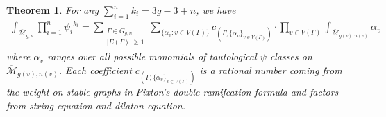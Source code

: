 \documentclass[12pt,reqno]{amsart}
\theoremstyle{plain}
\newtheorem{theorem}{Theorem}
\theoremstyle{definition}
\theoremstyle{remark}
\begin{document}
\begin{theorem}\label{thm:algo-inter}
  For any $\sum_{i=1}^{n}k_i=3g-3+n$, we have
\begin{align}\label{eqn:deg-3g-3+n-push-algo-int}
\int_{\overline{\mathcal{M}}_{g,n}}  \prod_{i=1}^{n}{\psi_i}^{k_i}   =\sum_{\substack{\Gamma\in G_{g,n}\\ |E(\Gamma)|\geq1}}\sum_{\{\alpha_{v}:v\in V(\Gamma)\}} c_{(\Gamma,\{\alpha_v\}_{v\in V(\Gamma)})}\cdot \prod_{v\in V(\Gamma)}\int_{\overline{\mathcal{M}}_{g(v),n(v)}}\alpha_{v}  
\end{align}
where  $\alpha_v$ ranges over all possible  monomials of tautological $\psi$ classes on $\overline{\mathcal{M}}_{g(v),n(v)}$.
Each coefficient $c_{(\Gamma,\{\alpha_v\}_{v\in V(\Gamma)})}$ is a rational number coming from the weight on stable graphs in Pixton's double ramifcation formula and factors from string equation and dilaton equation.        
\end{theorem}
\end{document}
